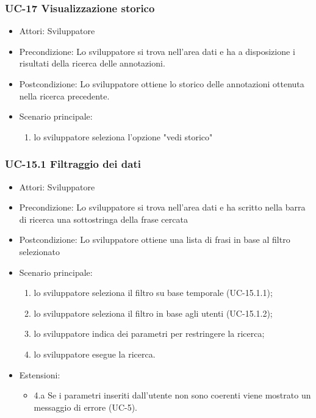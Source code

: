 	\subsubsection{UC-17 Visualizzazione storico}
		\begin{itemize}
			\item Attori: Sviluppatore
			\item Precondizione: Lo sviluppatore si trova nell'area dati e ha a disposizione i risultati della ricerca delle annotazioni.
			\item Postcondizione: Lo sviluppatore ottiene lo storico delle annotazioni ottenuta nella ricerca precedente.
			\item Scenario principale:
			\begin{enumerate}
				\item lo sviluppatore seleziona l'opzione "vedi storico"
			\end{enumerate}
		\end{itemize}
	
	\subsubsection{UC-15.1 Filtraggio dei dati}	
		\begin{itemize}
			\item Attori: Sviluppatore
			\item Precondizione: Lo sviluppatore si trova nell'area dati e ha scritto nella barra di ricerca una sottostringa della frase cercata
			\item Postcondizione: Lo sviluppatore ottiene una lista di frasi in base al filtro selezionato
			\item Scenario principale:
				\begin{enumerate}
					\item lo sviluppatore seleziona il filtro su base temporale (UC-15.1.1);
					\item lo sviluppatore seleziona il filtro in base agli utenti (UC-15.1.2);
					\item lo sviluppatore indica dei parametri per restringere la ricerca;
					\item lo sviluppatore esegue la ricerca.
				\end{enumerate}	
			\item Estensioni:
				\begin{itemize}
					\item 4.a Se i parametri inseriti dall'utente non sono coerenti viene mostrato un messaggio di errore (UC-5).
				\end{itemize}		
		\end{itemize}
	
